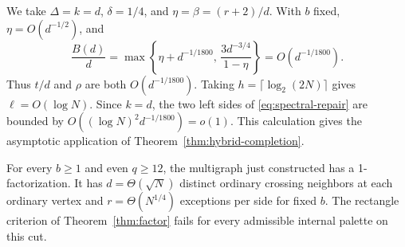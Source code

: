 We take \(\Delta=k=d\), \(\delta=1/4\), and \(\eta=\beta=(r+2)/d\). With \(b\) fixed, \(\eta=O(d^{-1/2})\), and
\[
 \frac{B(d)}{d}
 =\max\left\{\eta+d^{-1/1800},\,\frac{3d^{-3/4}}{1-\eta}\right\}
 =O(d^{-1/1800}).
\]
Thus \(t/d\) and \(\rho\) are both \(O(d^{-1/1800})\). Taking \(h=\lceil\log_2(2N)\rceil\) gives \(\ell=O(\log N)\). Since \(k=d\), the two left sides of \eqref{eq:spectral-repair} are bounded by \(O((\log N)^2d^{-1/1800})=o(1)\). This calculation gives the asymptotic application of Theorem~\ref{thm:hybrid-completion}.

\begin{corollary}\label{cor:sparse-grid}
For every \(b\ge1\) and even \(q\ge12\), the multigraph just constructed has a 1-factorization. It has \(d=\Theta(\sqrt N)\) distinct ordinary crossing neighbors at each ordinary vertex and \(r=\Theta(N^{1/4})\) exceptions per side for fixed \(b\). The rectangle criterion of Theorem~\ref{thm:factor} fails for every admissible internal palette on this cut.
\end{corollary}

